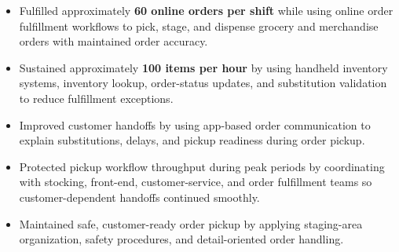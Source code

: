 \par\smallskip
\noindent
\begin{minipage}[t]{20cm}%
  \begin{minipage}[t]{9.75cm}%
    \begin{itemize}
      \item Fulfilled approximately \textbf{60 online orders per shift} while using online order fulfillment workflows to pick, stage, and dispense grocery and merchandise orders with maintained order accuracy.
      \item Sustained approximately \textbf{100 items per hour} by using handheld inventory systems, inventory lookup, order-status updates, and substitution validation to reduce fulfillment exceptions.
      \item Improved customer handoffs by using app-based order communication to explain substitutions, delays, and pickup readiness during order pickup.
    \end{itemize}
  \end{minipage}%
  \hfill%
  \begin{minipage}[t]{9.75cm}%
    \begin{itemize}
      \item Protected pickup workflow throughput during peak periods by coordinating with stocking, front-end, customer-service, and order fulfillment teams so customer-dependent handoffs continued smoothly.
      \item Maintained safe, customer-ready order pickup by applying staging-area organization, safety procedures, and detail-oriented order handling.
    \end{itemize}
  \end{minipage}%
\end{minipage}
\divider%

